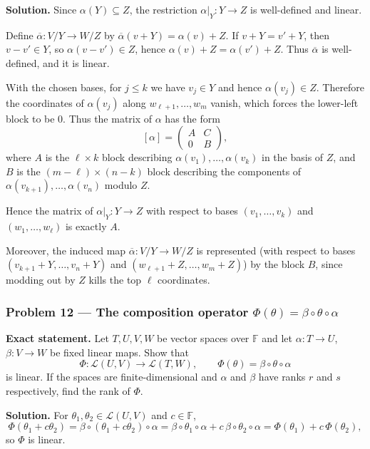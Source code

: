 \documentclass[12pt,a4paper]{article}
\theoremstyle{plain}
\theoremstyle{definition}      %
\begin{document}
\textbf{Solution.}
Since $\alpha(Y)\subseteq Z$, the restriction $\alpha|_Y:Y\to Z$ is well-defined and linear.

Define $\overline{\alpha}:V/Y\to W/Z$ by $\overline{\alpha}(v+Y)=\alpha(v)+Z$.
If $v+Y=v'+Y$, then $v-v'\in Y$, so $\alpha(v-v')\in Z$, hence $\alpha(v)+Z=\alpha(v')+Z$.
Thus $\overline{\alpha}$ is well-defined, and it is linear.

With the chosen bases, for $j\le k$ we have $v_j\in Y$ and hence $\alpha(v_j)\in Z$.
Therefore the coordinates of $\alpha(v_j)$ along $w_{\ell+1},\dots,w_m$ vanish, which forces the lower-left block to be $0$.
Thus the matrix of $\alpha$ has the form
\[
[\alpha]=\begin{pmatrix}
	A & C\\
	0 & B
\end{pmatrix},
\]
where $A$ is the $\ell\times k$ block describing $\alpha(v_1),\dots,\alpha(v_k)$ in the basis of $Z$,
and $B$ is the $(m-\ell)\times(n-k)$ block describing the components of $\alpha(v_{k+1}),\dots,\alpha(v_n)$
modulo $Z$.

Hence the matrix of $\alpha|_Y:Y\to Z$ with respect to bases $(v_1,\dots,v_k)$ and $(w_1,\dots,w_\ell)$ is exactly $A$.

Moreover, the induced map $\overline{\alpha}:V/Y\to W/Z$ is represented (with respect to bases
$(v_{k+1}+Y,\dots,v_n+Y)$ and $(w_{\ell+1}+Z,\dots,w_m+Z)$) by the block $B$, since modding out by $Z$
kills the top $\ell$ coordinates.

\bigskip

\subsubsection*{Problem 12 — The composition operator $\Phi(\theta)=\beta\circ\theta\circ\alpha$}

\textbf{Exact statement.}
Let $T,U,V,W$ be vector spaces over $\mathbb F$ and let $\alpha:T\to U$, $\beta:V\to W$ be fixed linear maps.
Show that
\[
\Phi:\mathcal L(U,V)\to \mathcal L(T,W),\qquad \Phi(\theta)=\beta\circ\theta\circ\alpha
\]
is linear. If the spaces are finite-dimensional and $\alpha$ and $\beta$ have ranks $r$ and $s$ respectively,
find the rank of $\Phi$.

\textbf{Solution.}
For $\theta_1,\theta_2\in\mathcal L(U,V)$ and $c\in\mathbb F$,
\[
\Phi(\theta_1+c\theta_2)
=\beta\circ(\theta_1+c\theta_2)\circ\alpha
=\beta\circ\theta_1\circ\alpha + c\,\beta\circ\theta_2\circ\alpha
=\Phi(\theta_1)+c\,\Phi(\theta_2),
\]
so $\Phi$ is linear.
\end{document}
